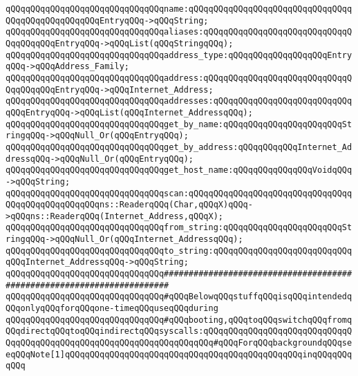 \newline
\verb|qQQqqQQqqQQqqQQqqQQqqQQqqQQqqQQqname:qQQqqQQqqQQqqQQqqQQqqQQqqQQqqQQqqQQqqQQqqQQqqQQqqQQqEntryqQQq->qQQqString;|\newline
\verb|qQQqqQQqqQQqqQQqqQQqqQQqqQQqqQQqaliases:qQQqqQQqqQQqqQQqqQQqqQQqqQQqqQQqqQQqqQQqEntryqQQq->qQQqList(qQQqStringqQQq);|\newline
\newline
\verb|qQQqqQQqqQQqqQQqqQQqqQQqqQQqqQQqaddress_type:qQQqqQQqqQQqqQQqqQQqEntryqQQq->qQQqAddress_Family;|\newline
\verb|qQQqqQQqqQQqqQQqqQQqqQQqqQQqqQQqaddress:qQQqqQQqqQQqqQQqqQQqqQQqqQQqqQQqqQQqqQQqEntryqQQq->qQQqInternet_Address;|\newline
\verb|qQQqqQQqqQQqqQQqqQQqqQQqqQQqqQQqaddresses:qQQqqQQqqQQqqQQqqQQqqQQqqQQqqQQqEntryqQQq->qQQqList(qQQqInternet_AddressqQQq);|\newline
\newline
\verb|qQQqqQQqqQQqqQQqqQQqqQQqqQQqqQQqget_by_name:qQQqqQQqqQQqqQQqqQQqqQQqStringqQQq->qQQqNull_Or(qQQqEntryqQQq);|\newline
\verb|qQQqqQQqqQQqqQQqqQQqqQQqqQQqqQQqget_by_address:qQQqqQQqqQQqInternet_AddressqQQq->qQQqNull_Or(qQQqEntryqQQq);|\newline
\newline
\verb|qQQqqQQqqQQqqQQqqQQqqQQqqQQqqQQqget_host_name:qQQqqQQqqQQqqQQqVoidqQQq->qQQqString;|\newline
\newline
\verb|qQQqqQQqqQQqqQQqqQQqqQQqqQQqqQQqscan:qQQqqQQqqQQqqQQqqQQqqQQqqQQqqQQqqQQqqQQqqQQqqQQqqQQqns::ReaderqQQq(Char,qQQqX)qQQq->qQQqns::ReaderqQQq(Internet_Address,qQQqX);|\newline
\newline
\verb|qQQqqQQqqQQqqQQqqQQqqQQqqQQqqQQqfrom_string:qQQqqQQqqQQqqQQqqQQqqQQqStringqQQq->qQQqNull_Or(qQQqInternet_AddressqQQq);|\newline
\verb|qQQqqQQqqQQqqQQqqQQqqQQqqQQqqQQqto_string:qQQqqQQqqQQqqQQqqQQqqQQqqQQqqQQqInternet_AddressqQQq->qQQqString;|\newline
\newline
\newline
\verb|qQQqqQQqqQQqqQQqqQQqqQQqqQQqqQQq#######################################################################|\newline
\verb|qQQqqQQqqQQqqQQqqQQqqQQqqQQqqQQq#qQQqBelowqQQqstuffqQQqisqQQqintendedqQQqonlyqQQqforqQQqone-timeqQQquseqQQqduring|\newline
\verb|qQQqqQQqqQQqqQQqqQQqqQQqqQQqqQQq#qQQqbooting,qQQqtoqQQqswitchqQQqfromqQQqdirectqQQqtoqQQqindirectqQQqsyscalls:qQQqqQQqqQQqqQQqqQQqqQQqqQQqqQQqqQQqqQQqqQQqqQQqqQQqqQQqqQQqqQQqqQQqqQQq#qQQqForqQQqbackgroundqQQqseeqQQqNote[1]qQQqqQQqqQQqqQQqqQQqqQQqqQQqqQQqqQQqqQQqqQQqqQQqinqQQqqQQqqQQq|\newline
